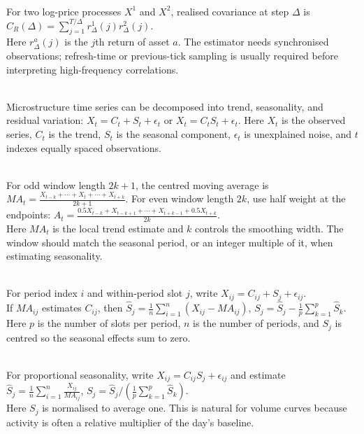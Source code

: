 \begin{model} \\
For two log-price processes $X^1$ and $X^2$, realised covariance at step $\Delta$ is $\hat{C}_R(\Delta)=\sum\limits_{j=1}^{T/\Delta}r_\Delta^1(j)r_\Delta^2(j)$.\\
Here $r_\Delta^a(j)$ is the $j$th return of asset $a$. The estimator needs synchronised observations; refresh-time or previous-tick sampling is usually required before interpreting high-frequency correlations.
\end{model}

\begin{model} \\
Microstructure time series can be decomposed into trend, seasonality, and residual variation: $X_t=C_t+S_t+\epsilon_t$ or $X_t=C_tS_t+\epsilon_t$. Here $X_t$ is the observed series, $C_t$ is the trend, $S_t$ is the seasonal component, $\epsilon_t$ is unexplained noise, and $t$ indexes equally spaced observations.
\end{model}

\begin{definition} \\
For odd window length $2k+1$, the centred moving average is $MA_t=\frac{X_{t-k}+\cdots+X_t+\cdots+X_{t+k}}{2k+1}$. For even window length $2k$, use half weight at the endpoints: $A_t=\frac{0.5X_{t-k}+X_{t-k+1}+\cdots+X_{t+k-1}+0.5X_{t+k}}{2k}$.\\
Here $MA_t$ is the local trend estimate and $k$ controls the smoothing width. The window should match the seasonal period, or an integer multiple of it, when estimating seasonality.
\end{definition}

\begin{model} \\
For period index $i$ and within-period slot $j$, write $X_{ij}=C_{ij}+S_j+\epsilon_{ij}$.\\
If $MA_{ij}$ estimates $C_{ij}$, then $\hat{S}_j=\frac{1}{n}\sum_{i=1}^{n}(X_{ij}-MA_{ij})$, $S_j=\hat{S}_j-\frac{1}{p}\sum_{k=1}^{p}\hat{S}_k$. Here $p$ is the number of slots per period, $n$ is the number of periods, and $S_j$ is centred so the seasonal effects sum to zero.
\end{model}

\begin{model} \\
For proportional seasonality, write $X_{ij}=C_{ij}S_j+\epsilon_{ij}$ and estimate $\hat{S}_j=\frac{1}{n}\sum\limits_{i=1}^{n}\frac{X_{ij}}{MA_{ij}}$, $S_j=\hat{S}_j / \left( \frac{1}{p}\sum\limits_{k=1}^{p}\hat{S}_k \right)$.\\
Here $S_j$ is normalised to average one. This is natural for volume curves because activity is often a relative multiplier of the day's baseline.
\end{model}

